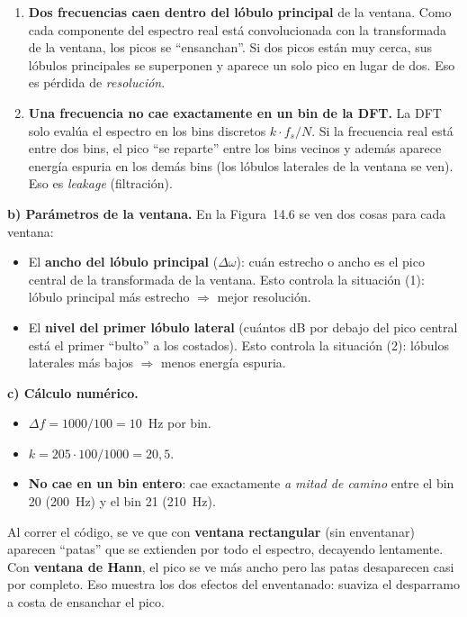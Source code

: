 \documentclass[11pt, a4paper]{article}
\begin{document}
\begin{enumerate}
  \item \textbf{Dos frecuencias caen dentro del l\'obulo principal} de la ventana.
    Como cada componente del espectro real est\'a convolucionada con la
    transformada de la ventana, los picos se ``ensanchan''.
    Si dos picos est\'an muy cerca, sus l\'obulos principales se superponen y
    aparece un solo pico en lugar de dos. Eso es p\'erdida de \emph{resoluci\'on}.

  \item \textbf{Una frecuencia no cae exactamente en un bin de la DFT.}
    La DFT solo eval\'ua el espectro en los bins discretos $k \cdot f_s/N$.
    Si la frecuencia real est\'a entre dos bins, el pico ``se reparte'' entre
    los bins vecinos y adem\'as aparece energ\'ia espuria en los dem\'as bins
    (los l\'obulos laterales de la ventana se ven). Eso es \emph{leakage}
    (filtraci\'on).
\end{enumerate}

\textbf{b) Par\'ametros de la ventana.}
En la Figura~14.6 se ven dos cosas para cada ventana:

\begin{itemize}
  \item El \textbf{ancho del l\'obulo principal} ($\Delta\omega$): cu\'an
    estrecho o ancho es el pico central de la transformada de la ventana.
    Esto controla la situaci\'on (1): l\'obulo principal m\'as estrecho
    $\Rightarrow$ mejor resoluci\'on.

  \item El \textbf{nivel del primer l\'obulo lateral}
    (cu\'antos dB por debajo del pico central est\'a el primer ``bulto''
    a los costados). Esto controla la situaci\'on (2):
    l\'obulos laterales m\'as bajos $\Rightarrow$ menos energ\'ia espuria.
\end{itemize}

\textbf{c) C\'alculo num\'erico.}
\begin{itemize}
  \item $\Delta f = 1000/100 = 10$~Hz por bin.
  \item $k = 205 \cdot 100 / 1000 = 20{,}5$.
  \item \textbf{No cae en un bin entero}: cae exactamente \emph{a mitad de
    camino} entre el bin 20 (200~Hz) y el bin 21 (210~Hz).
\end{itemize}

Al correr el c\'odigo, se ve que con \textbf{ventana rectangular} (sin enventanar)
aparecen ``patas'' que se extienden por todo el espectro, decayendo lentamente.
Con \textbf{ventana de Hann}, el pico se ve m\'as ancho pero las patas
desaparecen casi por completo. Eso muestra los dos efectos del enventanado:
suaviza el desparramo a costa de ensanchar el pico.
\end{document}
